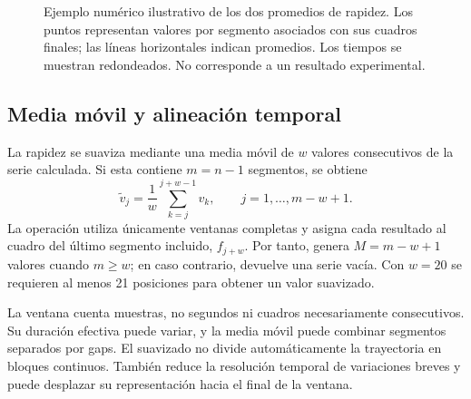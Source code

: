 \begin{figure}[htbp]
  \centering
  \caption{Ejemplo numérico ilustrativo de los dos promedios de rapidez. Los puntos representan valores por segmento asociados con sus cuadros finales; las líneas horizontales indican promedios. Los tiempos se muestran redondeados. No corresponde a un resultado experimental.}
  \label{fig:promedios-rapidez}
\end{figure}

\subsection{Media móvil y alineación temporal}

La rapidez se suaviza mediante una media móvil de $w$ valores consecutivos de la serie calculada. Si esta contiene $m=n-1$ segmentos, se obtiene
\begin{equation}
  \widetilde{v}_j=\frac{1}{w}\sum_{k=j}^{j+w-1}v_k,
  \qquad j=1,\ldots,m-w+1.
\end{equation}
La operación utiliza únicamente ventanas completas y asigna cada resultado al cuadro del último segmento incluido, $f_{j+w}$. Por tanto, genera $M=m-w+1$ valores cuando $m\geq w$; en caso contrario, devuelve una serie vacía. Con $w=20$ se requieren al menos 21 posiciones para obtener un valor suavizado.

La ventana cuenta muestras, no segundos ni cuadros necesariamente consecutivos. Su duración efectiva puede variar, y la media móvil puede combinar segmentos separados por gaps. El suavizado no divide automáticamente la trayectoria en bloques continuos. También reduce la resolución temporal de variaciones breves y puede desplazar su representación hacia el final de la ventana.

